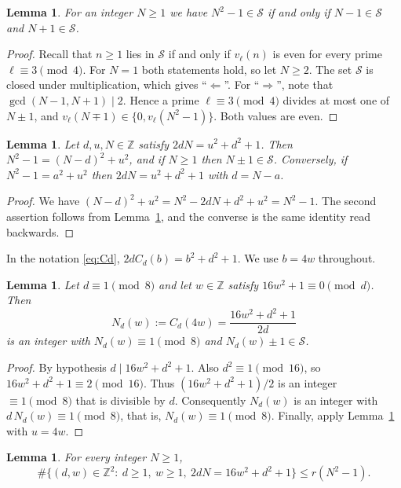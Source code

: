 \documentclass[11pt]{amsart}
\newtheorem{lemma}[theorem]{Lemma}
\theoremstyle{remark}
\theoremstyle{definition}
\numberwithin{equation}{section}
\newcommand{\Sc}{\mathcal{S}}
\newcommand{\Z}{\mathbb{Z}}
\begin{document}
\begin{lemma}\label{lem:Npm}
For an integer $N\ge1$ we have $N^2-1\in\Sc$ if and only if $N-1\in\Sc$ and $N+1\in\Sc$.
\end{lemma}

\begin{proof}
Recall that $n\ge1$ lies in $\Sc$ if and only if $v_\ell(n)$ is even for every prime $\ell\equiv3\pmod4$. For $N=1$ both statements hold, so let $N\ge2$. The set $\Sc$ is closed under multiplication, which gives ``$\Leftarrow$''. For ``$\Rightarrow$'', note that $\gcd(N-1,N+1)\mid 2$. Hence a prime $\ell\equiv 3\pmod 4$ divides at most one of $N\pm1$, and $v_\ell(N\mp1)\in\{0,v_\ell(N^2-1)\}$. Both values are even.
\end{proof}

\begin{lemma}\label{lem:identity}
Let $d,u,N\in\Z$ satisfy $2dN=u^2+d^2+1$. Then $N^2-1=(N-d)^2+u^2$, and if $N\ge1$ then $N\pm1\in\Sc$. Conversely, if $N^2-1=a^2+u^2$ then $2dN=u^2+d^2+1$ with $d=N-a$.
\end{lemma}

\begin{proof}
We have $(N-d)^2+u^2=N^2-2dN+d^2+u^2=N^2-1$. The second assertion follows from Lemma~\ref{lem:Npm}, and the converse is the same identity read backwards.
\end{proof}

In the notation \eqref{eq:Cd}, $2dC_d(b)=b^2+d^2+1$. We use $b=4w$ throughout.

\begin{lemma}\label{lem:family}
Let $d\equiv 1\pmod 8$ and let $w\in\Z$ satisfy $16w^2+1\equiv0\pmod d$. Then
\[
N_d(w):=C_d(4w)=\frac{16w^2+d^2+1}{2d}
\]
is an integer with $N_d(w)\equiv 1\pmod 8$ and $N_d(w)\pm1\in\Sc$.
\end{lemma}

\begin{proof}
By hypothesis $d\mid 16w^2+d^2+1$. Also $d^2\equiv1\pmod{16}$, so $16w^2+d^2+1\equiv 2\pmod{16}$. Thus $(16w^2+d^2+1)/2$ is an integer $\equiv1\pmod 8$ that is divisible by $d$. Consequently $N_d(w)$ is an integer with $d\,N_d(w)\equiv1\pmod 8$, that is, $N_d(w)\equiv1\pmod 8$. Finally, apply Lemma~\ref{lem:identity} with $u=4w$.
\end{proof}

\begin{lemma}\label{lem:mult}
For every integer $N\ge1$,
\[
\#\{(d,w)\in\Z^2:\ d\ge1,\ w\ge1,\ 2dN=16w^2+d^2+1\}\le r(N^2-1).
\]
\end{lemma}
\end{document}
